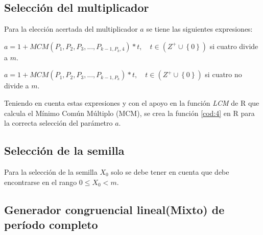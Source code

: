 \documentclass{article}
\begin{document}
\begin{center}

\label{cod:3}
\end{center}

\subsection{Selección del multiplicador}
Para la elección acertada del multiplicador $a$ se tiene las siguientes expresiones:

$a=1+MCM(P_{1},P_{2},P_{3},...,P_{k-1,P_{k},4})*t, \quad t \in (Z^{+} \cup \left\{0 \right\} )$ si cuatro divide a $m$.

$a=1+MCM(P_{1},P_{2},P_{3},...,P_{k-1,P_{k}})*t, \quad t \in (Z^{+} \cup \left\{0 \right\} )$ si cuatro no divide a $m$.

Teniendo en cuenta estas expresiones y con el apoyo en la función \textit{LCM} de R que calcula el Mínimo Común Múltiplo (MCM), se crea la función \ref{cod:4} en R para la correcta selección del parámetro $a$.

\begin{center}

\label{cod:4}
\end{center}
\subsection{Selección de la semilla}
Para la selección de la semilla $X_{0}$ solo se debe tener en cuenta que debe encontrarse en el rango $0\leq X_{0}<m$.
\subsection{Generador congruencial lineal(Mixto) de período completo}
\end{document}
